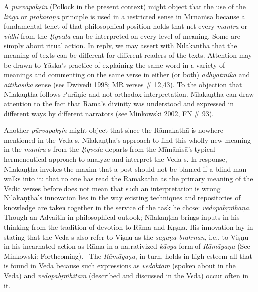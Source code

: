 A \textit{pūrvapakṣin} (Pollock in the present context) might object that the use of the \textit{liṅga} or \textit{prakaraṇa} principle is used in a restricted sense in Mīmāṁsā because a fundamental tenet of that philosophical position holds that not every \textit{mantra} or \textit{vidhi} from the \textit{Ṛgveda} can be interpreted on every level of meaning. Some are simply about ritual action. In reply, we may assert with Nīlakaṇṭha that the meaning of texts can be different for different readers of the texts. Attention may be drawn to Yāska's practice of explaining the same word in a variety of meanings and commenting on the same verse in either (or both) \textit{adhyātmika} and \textit{aitihāsika} sense (see Dwivedi 1998; MR verses \# 12,43). To the objection that Nīlakaṇṭha follows Purāṇic and not orthodox interpretation, Nīlakaṇṭha can draw attention to the fact that Rāma's divinity was understood and expressed in different ways by different narrators (see Minkowski 2002, FN \# 93).

Another \textit{pūrvapakṣin }might object that since the Rāmakathā is nowhere mentioned in the Veda-s, Nīlakaṇṭha’s approach to find this wholly new meaning in the \textit{mantra}-s from the \textit{Ṛgveda} departs from the Mīmāṁsā’s typical hermeneutical approach to analyze and interpret the Veda-s. In response, Nīlakaṇṭha invokes the maxim that a post should not be blamed if a blind man walks into it: that no one has read the Rāmakathā as the primary meaning of the Vedic verses before does not mean that such an interpretation is wrong Nīlakaṇṭha's innovation lies in the way existing techniques and repositories of knowledge are taken together in the service of the task he chose: \textit{vedopabṛṁhaṇa}. Though an Advaitin in philosophical outlook; Nīlakaṇṭha brings inputs in his thinking from the tradition of devotion to Rāma and Kṛṣṇa. His innovation lay in stating that the Veda-s also refer to Viṣṇu as the \textit{saguṇa brahman}, i.e., to Viṣṇu in his incarnated action as Rāma in a narrativized \textit{kāvya} form of \textit{Rāmāyaṇa} (See Minkowski: Forthcoming).  The \textit{Rāmāyaṇa}, in turn, holds in high esteem all that is found in Veda because such expressions as \textit{vedoktam} (spoken about in the Veda) and \textit{vedopabṛṁhitam} (described and discussed in the Veda) occur often in it.


